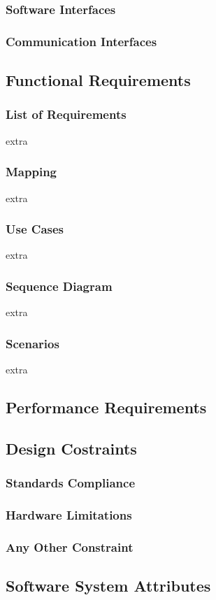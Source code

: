 \documentclass{article}
\begin{document}
		\subsubsection{Software Interfaces}
		\subsubsection{Communication Interfaces}
	\subsection{Functional Requirements}
		\subsubsection{List of Requirements}
		extra
		\subsubsection{Mapping}
		extra
		\subsubsection{Use Cases}
		extra
		\subsubsection{Sequence Diagram}
		extra
		\subsubsection{Scenarios}
		extra
	\subsection{Performance Requirements}
	\subsection{Design Costraints}
		\subsubsection{Standards Compliance}
		\subsubsection{Hardware Limitations}
		\subsubsection{Any Other Constraint}
	\subsection{Software System Attributes}
\end{document}
